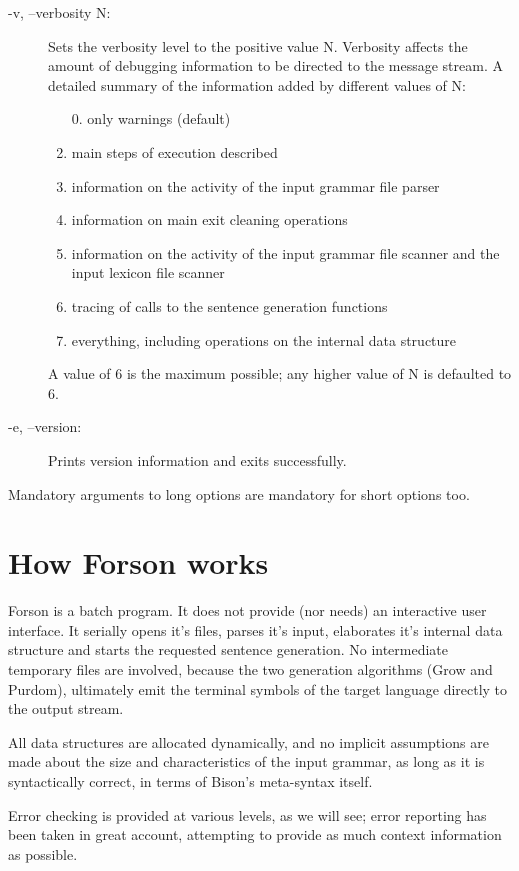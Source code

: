 \documentclass[a4paper,12pt]{article}
\begin{document}
\begin{description}
\item[-v, --verbosity N:]
Sets the verbosity level to the positive value N. Verbosity affects the amount of debugging information to be directed to the message stream. A detailed summary of the information added by different values of N:
\begin{enumerate}
\item[0.]
only warnings (default)
\item
main steps of execution described
\item
information on the activity of the input grammar file parser
\item
information on main exit cleaning operations
\item
information on the activity of the input grammar file scanner and the input lexicon file scanner
\item
tracing of calls to the sentence generation functions
\item
everything, including operations on the internal data structure
\end{enumerate}
\noindent
A value of 6 is the maximum possible; any higher value of N is defaulted to 6.

\item[-e, --version:]
Prints version information and exits successfully.
\end{description}
\noindent
Mandatory arguments to long options are mandatory for short options too.



\section{How Forson works}

Forson is a batch program. It does not provide (nor needs) an interactive user interface. It serially opens it's files, parses it's input, elaborates it's internal data structure and starts the requested sentence generation. No intermediate temporary files are involved, because the two generation algorithms (Grow and Purdom), ultimately emit the terminal symbols of the target language directly to the output stream.

All data structures are allocated dynamically, and no implicit assumptions are made about the size and characteristics of the input grammar, as long as it is syntactically correct, in terms of Bison's meta-syntax itself.

Error checking is provided at various levels, as we will see; error reporting has been taken in great account, attempting to provide as much context information as possible.
\end{document}
